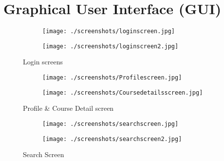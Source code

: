 \newpage
\section{Graphical User Interface (GUI)} 

\begin{figure}[h!]
    \centering
    \begin{subfigure}{.5\textwidth}
      \centering
      \texttt{[image: ./screenshots/loginscreen.jpg]}
      \label{fig:loginscreen}
    \end{subfigure}%
    \begin{subfigure}{.5\textwidth}
      \centering
      \texttt{[image: ./screenshots/loginscreen2.jpg]}
      \label{fig:loginscrren2}
    \end{subfigure}
    \caption{Login screens}
    \label{fig:loginscreens}
    \end{figure}

    \begin{figure}[h!]
        \centering
        \begin{subfigure}{.5\textwidth}
          \centering
          \texttt{[image: ./screenshots/Profilescreen.jpg]}
          \label{fig:profilescreen}
        \end{subfigure}%
        \begin{subfigure}{.5\textwidth}
          \centering
          \texttt{[image: ./screenshots/Coursedetailsscreen.jpg]}
          \label{fig:corursedeatilscreen}
        \end{subfigure}
        \caption{Profile \& Course Detail screen}
        \label{fig: profileandcourse}
        \end{figure}

    \begin{figure}[h!]
        \centering
        \begin{subfigure}{.5\textwidth}
          \centering
          \texttt{[image: ./screenshots/searchscreen.jpg]}
          \label{fig:searchscreen}
        \end{subfigure}%
        \begin{subfigure}{.5\textwidth}
          \centering
          \texttt{[image: ./screenshots/searchscreen2.jpg]}
          \label{fig:searchscreen2}
        \end{subfigure}
        \caption{Search Screen}
        \label{fig:searchscreens}
        \end{figure}

